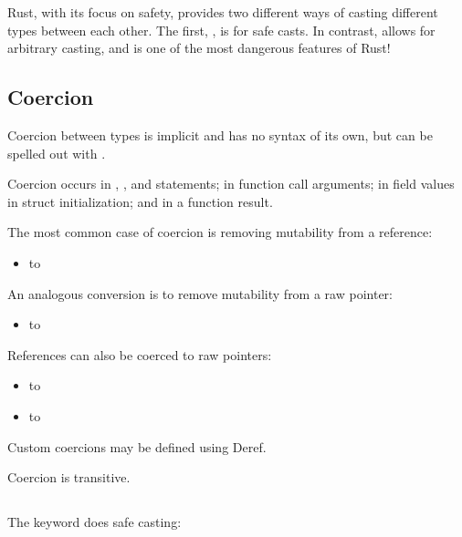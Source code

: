 Rust, with its focus on safety, provides two different ways of casting different types between each other. The first, , is 
for safe casts. In contrast,  allows for arbitrary casting, and is one of the most dangerous features of Rust!

\subsection*{Coercion}

Coercion between types is implicit and has no syntax of its own, but can be spelled out with .

\blank

Coercion occurs in \keylet, , and  statements; in function call arguments; in field values in struct 
initialization; and in a function result.

\blank

The most common case of coercion is removing mutability from a reference:

\begin{itemize}
  \item{ to }
\end{itemize}

An analogous conversion is to remove mutability from a raw pointer:

\begin{itemize}
  \item{ to }
\end{itemize}

References can also be coerced to raw pointers:

\begin{itemize}
  \item{ to }
  \item{ to }
\end{itemize}

Custom coercions may be defined using Deref.

\blank

Coercion is transitive.

\subsection*{}

The  keyword does safe casting:

